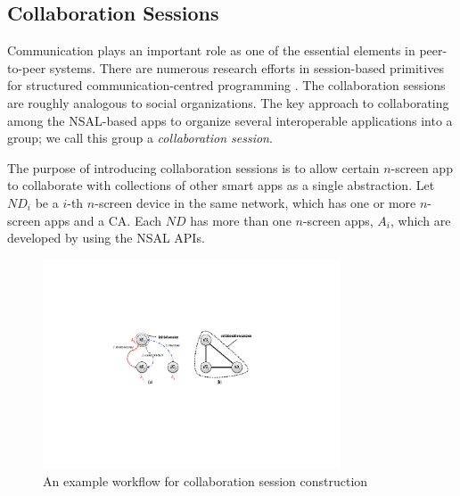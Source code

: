 \documentclass[conference]{IEEEtran}
\begin{document}
\subsection{Collaboration Sessions}
Communication plays an important role as one of the essential elements in peer-to-peer systems. There are numerous research efforts in session-based primitives for structured communication-centred programming  \cite{Honda:2008, Yoshida:2007}.
The collaboration sessions are roughly analogous to social organizations.
The key approach to collaborating among the NSAL-based apps to organize several interoperable applications into a group; we call this group a \textit{collaboration session}.

The purpose of introducing collaboration sessions is to allow certain $n$-screen app to collaborate with collections of other smart apps as a single abstraction. Let $ND_i$ be a $i$-th $n$-screen device in the same network,  which has one or more $n$-screen apps and a CA.
Each $ND$ has more than one $n$-screen apps, $A_i$, which are developed by using the NSAL APIs.
    \begin{figure}[htb] %
    \centering
    \includegraphics[width=8.8cm,keepaspectratio]{consession}
    \caption{An example workflow for collaboration session construction}
    \label{fig:constructsession}
    \end{figure}
\end{document}
